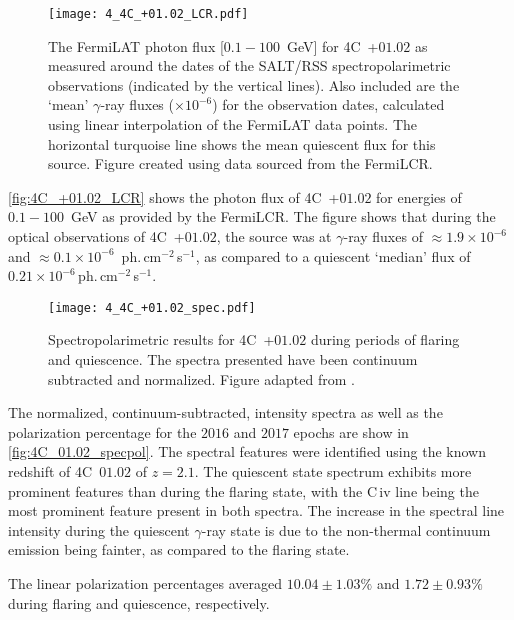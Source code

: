 \begin{figure}[t]
    \centering
    \texttt{[image: 4\_4C\_+01.02\_LCR.pdf]}
    \caption{The \gls{FermiLAT} photon flux [$0.1 - 100$~GeV] for 4C~+$01.02$ as measured around the dates of the \gls{SALT}/\gls{RSS} spectropolarimetric observations (indicated by the vertical lines). Also included are the `mean' $\gamma$-ray fluxes ($\times 10^{-6}$) for the observation dates, calculated using linear interpolation of the \gls{FermiLAT} data points. The horizontal turquoise line shows the mean quiescent flux for this source. Figure created using data sourced from the \gls{FermiLCR}.\protect\footnotemark}
    \label{fig:4C_+01.02_LCR}
\end{figure}

\autoref{fig:4C_+01.02_LCR} shows the photon flux of 4C~+$01.02$ for energies of $0.1 - 100$~GeV as provided by the \gls{FermiLCR}.
The figure shows that during the optical observations of 4C~+$01.02$, the source was at $\gamma$-ray fluxes of $\approx 1.9 \times 10^{-6}$ and $\approx 0.1 \times 10^{-6}$~ph.\,cm$^{-2}$\,s$^{-1}$, as compared to a quiescent `median' flux of $0.21 \times 10^{-6}$\,ph.\,cm$^{-2}$\,s$^{-1}$.

\begin{figure}[t]
    \centering
    \texttt{[image: 4\_4C\_+01.02\_spec.pdf]}
    \caption{Spectropolarimetric results for 4C~+$01.02$ during periods of flaring and quiescence. The spectra presented have been continuum subtracted and normalized. Figure adapted from \citep{Schutte4C0102}.}
    \label{fig:4C_01.02_specpol}
\end{figure}


The normalized, continuum-subtracted, intensity spectra as well as the polarization percentage for the $2016$ and $2017$ epochs are show in \autoref{fig:4C_01.02_specpol}.
The spectral features were identified using the known redshift of 4C~$01.02$ of $z = 2.1$.
The quiescent state spectrum exhibits more prominent features than during the flaring state, with the C\,{\sc iv} line being the most prominent feature present in both spectra.
The increase in the spectral line intensity during the quiescent $\gamma$-ray state is due to the non-thermal continuum emission being fainter, as compared to the flaring state.

The linear polarization percentages averaged $10.04 \pm 1.03\%$ and $1.72 \pm 0.93\%$ during flaring and quiescence, respectively.

